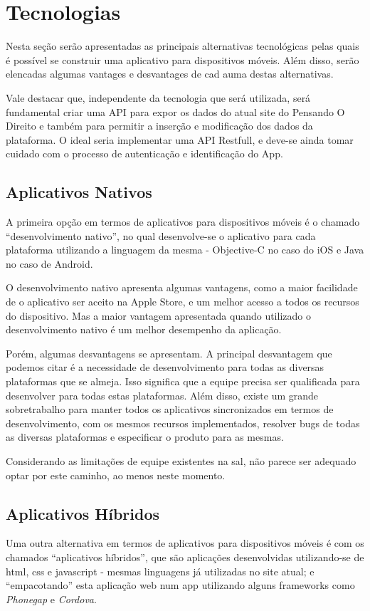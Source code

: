 \section{Tecnologias}\label{sec:tecnologias}
Nesta seção serão apresentadas as principais alternativas tecnológicas pelas quais é possível se construir uma aplicativo para dispositivos móveis. Além disso, serão elencadas algumas vantages e desvantages de cad auma destas alternativas.

Vale destacar que, independente da tecnologia que será utilizada, será fundamental criar uma API para expor os dados do atual site do Pensando O Direito e também para permitir a inserção e modificação dos dados da plataforma. O ideal seria implementar uma API Restfull, e deve-se ainda tomar cuidado com o processo de autenticação e identificação do App.

\subsection{Aplicativos Nativos}
A primeira opção em termos de aplicativos para dispositivos móveis é o chamado ``desenvolvimento nativo'', no qual desenvolve-se o aplicativo para cada plataforma utilizando a linguagem da mesma - Objective-C no caso do iOS e Java no caso de Android.

O desenvolvimento nativo apresenta algumas vantagens, como a maior facilidade de o aplicativo ser aceito na Apple Store, e um melhor acesso a todos os recursos do dispositivo. Mas a maior vantagem apresentada quando utilizado o desenvolvimento nativo é um melhor desempenho da aplicação.

Porém, algumas desvantagens se apresentam. A principal desvantagem que podemos citar é a necessidade de desenvolvimento para todas as diversas plataformas que se almeja. Isso significa que a equipe precisa ser qualificada para desenvolver para todas estas plataformas. Além disso, existe um grande sobretrabalho para manter todos os aplicativos sincronizados em termos de desenvolvimento, com os mesmos recursos implementados, resolver bugs de todas as diversas plataformas e especificar o produto para as mesmas.

Considerando as limitações de equipe existentes na \gls{sal}, não parece ser adequado optar por este caminho, ao menos neste momento.

\subsection{Aplicativos Híbridos}
Uma outra alternativa em termos de aplicativos para dispositivos móveis é com os chamados ``aplicativos híbridos'', que são aplicações desenvolvidas utilizando-se de html, css e javascript - mesmas linguagens já utilizadas no site atual; e ``empacotando'' esta aplicação web num app utilizando alguns frameworks como \textit{Phonegap} e \textit{Cordova}.

